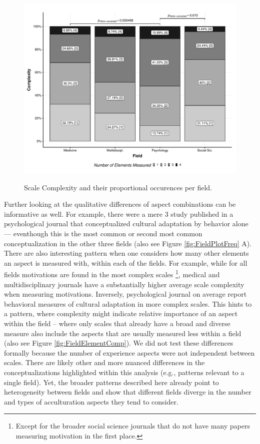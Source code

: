 \begin{figure}[h]
\centering
\caption{Scale Complexity and their proportional occurences per field.}
\includegraphics[width=\textwidth]{Figures/FieldPlotComplexityAverage-1}
\label{fig:FieldPlotComplexityAverage}
\end{figure}

Further looking at the qualitative differences of aspect combinations
can be informative as well. For example, there were a mere 3 study
published in a psychological journal that conceptualized cultural
adaptation by behavior alone --- eventhough this is the most common or
second most common conceptualization in the other three fields (also see
Figure \ref{fig:FieldPlotFreq} A). There are also interesting pattern
when one considers how many other elements an aspect is measured with,
within each of the fields. For example, while for all fields motivations
are found in the most complex scales
\footnote{Except for the broader social science journals that do not have many papers measuring motivation in the first place.},
medical and multidisciplinary journals have a substantially higher
average scale complexity when measuring motivations. Inversely,
psychological journal on average report behavioral measures of cultural
adaptation in more complex scales. This hints to a pattern, where
complexity might indicate relative importance of an aspect within the
field -- where only scales that already have a broad and diverse measure
also include the aspects that are usually measured less within a field
(also see Figure \ref{fig:FieldElementComp}). We did not test these
differences formally because the number of experience aspects were not
independent between scales. There are likely other and more nuanced
differences in the conceptualizations highlighted within this analysis
(e.g., patterns relevant to a single field). Yet, the broader patterns
described here already point to heterogeneity between fields and show
that different fields diverge in the number and types of acculturation
aspects they tend to consider.

